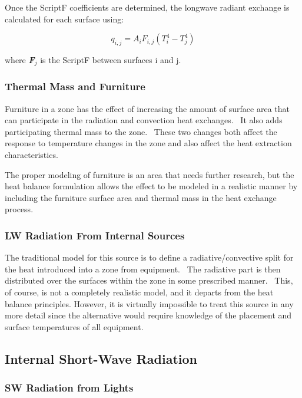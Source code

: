 Once the ScriptF coefficients are determined, the longwave radiant exchange is calculated for each surface using:

\begin{equation}
{q_{i,j}} = {A_i}{F_{i,j}}\left( {T_i^4 - T_j^4} \right)
\end{equation}

where \textbf{\emph{F}}\(_{j}\) is the ScriptF between surfaces i and j.

\subsubsection{Thermal Mass and Furniture}\label{thermal-mass-and-furniture}

Furniture in a zone has the effect of increasing the amount of surface area that can participate in the radiation and convection heat exchanges.~ It also adds participating thermal mass to the zone.~ These two changes both affect the response to temperature changes in the zone and also affect the heat extraction characteristics.

The proper modeling of furniture is an area that needs further research, but the heat balance formulation allows the effect to be modeled in a realistic manner by including the furniture surface area and thermal mass in the heat exchange process.

\subsubsection{LW Radiation From Internal Sources}\label{lw-radiation-from-internal-sources}

The traditional model for this source is to define a radiative/convective split for the heat introduced into a zone from equipment.~ The radiative part is then distributed over the surfaces within the zone in some prescribed manner.~ This, of course, is not a completely realistic model, and it departs from the heat balance principles. However, it is virtually impossible to treat this source in any more detail since the alternative would require knowledge of the placement and surface temperatures of all equipment.

\subsection{Internal Short-Wave Radiation}\label{internal-short-wave-radiation}

\subsubsection{SW Radiation from Lights}\label{sw-radiation-from-lights}

